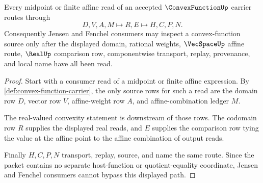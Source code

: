 \begin{theorem}
\label{thm:convex-function-midpoint-route}
Every midpoint or finite affine read of an accepted $\ConvexFunctionUp$ carrier routes through
$$
D,V,A,M \longmapsto R,E \longmapsto H,C,P,N .
$$
Consequently Jensen and Fenchel consumers may inspect a convex-function source only after the displayed domain, rational weights, $\VecSpaceUp$ affine route, $\RealUp$ comparison row, componentwise transport, replay, provenance, and local name have all been read.
\end{theorem}
\begin{proof}
Start with a consumer read of a midpoint or finite affine expression. By \autoref{def:convex-function-carrier}, the only source rows for such a read are the domain row $D$, vector row $V$, affine-weight row $A$, and affine-combination ledger $M$.

The real-valued convexity statement is downstream of those rows. The codomain row $R$ supplies the displayed real reads, and $E$ supplies the comparison row tying the value at the affine point to the affine combination of output reads.

Finally $H,C,P,N$ transport, replay, source, and name the same route. Since the packet contains no separate host-function or quotient-equality coordinate, Jensen and Fenchel consumers cannot bypass this displayed path.
\end{proof}





